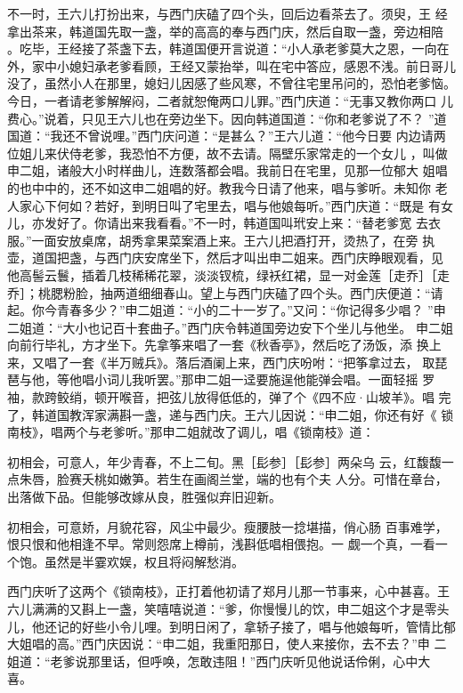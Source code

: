 不一时，王六儿打扮出来，与西门庆磕了四个头，回后边看茶去了。须臾，王
经拿出茶来，韩道国先取一盏，举的高高的奉与西门庆，然后自取一盏，旁边相陪
。吃毕，王经接了茶盏下去，韩道国便开言说道：“小人承老爹莫大之恩，一向在
外，家中小媳妇承老爹看顾，王经又蒙抬举，叫在宅中答应，感恩不浅。前日哥儿
没了，虽然小人在那里，媳妇儿因感了些风寒，不曾往宅里吊问的，恐怕老爹恼。
今日，一者请老爹解解闷，二者就恕俺两口儿罪。”西门庆道：“无事又教你两口
儿费心。”说着，只见王六儿也在旁边坐下。因向韩道国道：“你和老爹说了不？
”道国道：“我还不曾说哩。”西门庆问道：“是甚么？”王六儿道：“他今日要
内边请两位姐儿来伏侍老爹，我恐怕不方便，故不去请。隔壁乐家常走的一个女儿
，叫做申二姐，诸般大小时样曲儿，连数落都会唱。我前日在宅里，见那一位郁大
姐唱的也中中的，还不如这申二姐唱的好。教我今日请了他来，唱与爹听。未知你
老人家心下何如？若好，到明日叫了宅里去，唱与他娘每听。”西门庆道：“既是
有女儿，亦发好了。你请出来我看看。”不一时，韩道国叫玳安上来：“替老爹宽
去衣服。”一面安放桌席，胡秀拿果菜案酒上来。王六儿把酒打开，烫热了，在旁
执壶，道国把盏，与西门庆安席坐下，然后才叫出申二姐来。西门庆睁眼观看，见
他高髻云鬟，插着几枝稀稀花翠，淡淡钗梳，绿袄红裙，显一对金莲［走乔］［走
乔］；桃腮粉脸，抽两道细细春山。望上与西门庆磕了四个头。西门庆便道：“请
起。你今青春多少？”申二姐道：“小的二十一岁了。”又问：“你记得多少唱？
”申二姐道：“大小也记百十套曲子。”西门庆令韩道国旁边安下个坐儿与他坐。
申二姐向前行毕礼，方才坐下。先拿筝来唱了一套《秋香亭》，然后吃了汤饭，添
换上来，又唱了一套《半万贼兵》。落后酒阑上来，西门庆吩咐：“把筝拿过去，
取琵琶与他，等他唱小词儿我听罢。”那申二姐一迳要施逞他能弹会唱。一面轻摇
罗袖，款跨鲛绡，顿开喉音，把弦儿放得低低的，弹了个《四不应·山坡羊》。唱
完了，韩道国教浑家满斟一盏，递与西门庆。王六儿因说：“申二姐，你还有好《
锁南枝》，唱两个与老爹听。”那申二姐就改了调儿，唱《锁南枝》道：

初相会，可意人，年少青春，不上二旬。黑［髟参］［髟参］两朵乌
云，红馥馥一点朱唇，脸赛夭桃如嫩笋。若生在画阁兰堂，端的也有个夫
人分。可惜在章台，出落做下品。但能够改嫁从良，胜强似弃旧迎新。

初相会，可意娇，月貌花容，风尘中最少。瘦腰肢一捻堪描，俏心肠
百事难学，恨只恨和他相逢不早。常则怨席上樽前，浅斟低唱相偎抱。一
觑一个真，一看一个饱。虽然是半霎欢娱，权且将闷解愁消。

西门庆听了这两个《锁南枝》，正打着他初请了郑月儿那一节事来，心中甚喜。王
六儿满满的又斟上一盏，笑嘻嘻说道：“爹，你慢慢儿的饮，申二姐这个才是零头
儿，他还记的好些小令儿哩。到明日闲了，拿轿子接了，唱与他娘每听，管情比郁
大姐唱的高。”西门庆因说：“申二姐，我重阳那日，使人来接你，去不去？”申
二姐道：“老爹说那里话，但呼唤，怎敢违阻！”西门庆听见他说话伶俐，心中大
喜。

